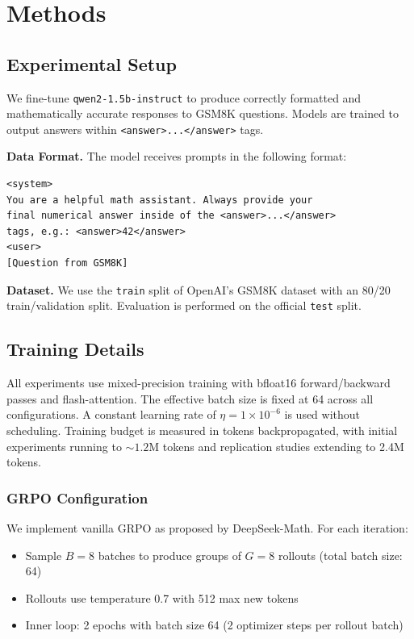 \documentclass[11pt]{article}
\begin{document}
\section{Methods}

\subsection{Experimental Setup}

We fine-tune \texttt{qwen2-1.5b-instruct} to produce correctly formatted and mathematically accurate responses to GSM8K questions. Models are trained to output answers within \texttt{<answer>...</answer>} tags.

\textbf{Data Format.} The model receives prompts in the following format:

\begin{verbatim}
<system>
You are a helpful math assistant. Always provide your
final numerical answer inside of the <answer>...</answer>
tags, e.g.: <answer>42</answer>
<user>
[Question from GSM8K]
\end{verbatim}

\textbf{Dataset.} We use the \texttt{train} split of OpenAI's GSM8K dataset with an 80/20 train/validation split. Evaluation is performed on the official \texttt{test} split.

\subsection{Training Details}

All experiments use mixed-precision training with bfloat16 forward/backward passes and flash-attention. The effective batch size is fixed at 64 across all configurations. A constant learning rate of $\eta = 1 \times 10^{-6}$ is used without scheduling. Training budget is measured in tokens backpropagated, with initial experiments running to ${\sim}1.2$M tokens and replication studies extending to 2.4M tokens.

\subsubsection{GRPO Configuration}

We implement vanilla GRPO as proposed by DeepSeek-Math. For each iteration:
\begin{itemize}
    \item Sample $B = 8$ batches to produce groups of $G = 8$ rollouts (total batch size: 64)
    \item Rollouts use temperature 0.7 with 512 max new tokens
    \item Inner loop: 2 epochs with batch size 64 (2 optimizer steps per rollout batch)
\end{itemize}
\end{document}
